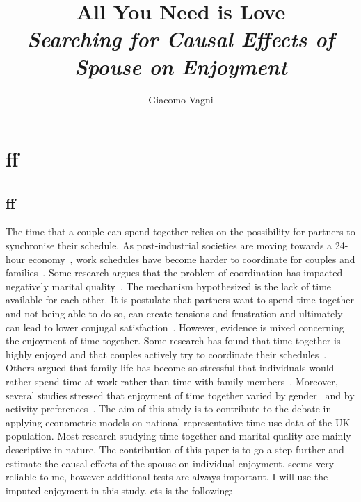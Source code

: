 \documentclass[doc, twocolumn]{apa}[12pt]
\author{Giacomo Vagni}
\title{All You Need is Love \\ \emph{Searching for Causal Effects of Spouse on Enjoyment}}
\affiliation{PhD Student \\ University of Oxford \\ Nuffield College}
\begin{document}
	\maketitle
	\newpage 

\section{ff}
\subsection{ff}

The time that a couple can spend together relies on the possibility for partners to synchronise their schedule. As post-industrial societies are moving towards a 24-hour economy~\cite{presser2005working}, work schedules have become harder to coordinate for couples and families~\cite{Lesnard2009-kl}. Some research argues that the problem of coordination has impacted negatively marital quality~\cite{Mills2010-ux}. The mechanism hypothesized is the lack of time available for each other. It is postulate that partners want to spend time together and not being able to do so, can create tensions and frustration and ultimately can lead to lower conjugal satisfaction~\cite{hill1988marital}. However, evidence is mixed concerning the enjoyment of time together. Some research has found that time together is highly enjoyed and that couples actively try to coordinate their schedules~\cite{Sullivan1996-pa, Flood2016-qz}. Others argued that family life has become so stressful that individuals would rather spend time at work rather than time with family members~\cite{Hochschild2012-yd}. Moreover, several studies stressed that enjoyment of time together varied by gender~\cite{Milkie1999-su} and by activity preferences~\cite{Crawford2002-hy}. The aim of this study is to contribute to the debate in applying econometric models on national representative time use data of the UK population. Most research studying time together and marital quality are mainly descriptive in nature. The contribution of this paper is to go a step further and estimate the causal effects of the spouse on individual enjoyment. 
seems very reliable to me, however additional tests are always important. I will use the imputed enjoyment in this study. cts is the following: 
\end{document}
